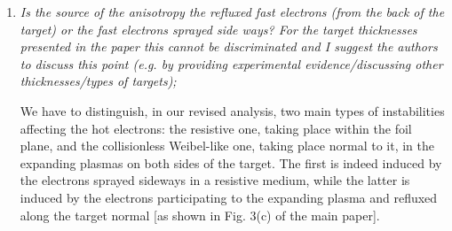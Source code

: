 \documentclass{article}
\begin{document}
\begin{enumerate}
\item \textit{Is the source of the anisotropy the refluxed fast electrons (from the back of the target) or the fast electrons sprayed side ways? For the target thicknesses presented in the paper this cannot be discriminated and I suggest the authors to discuss this point (e.g. by providing experimental evidence/discussing other thicknesses/types of targets); }

We have to distinguish, in our revised analysis, two main types of instabilities affecting the hot electrons: the resistive one, taking place within the foil plane, and the collisionless Weibel-like one, taking place normal to it, in the expanding plasmas on both sides of the target. The first is indeed induced by the electrons sprayed sideways in a resistive medium, while the latter is induced by the electrons participating to the expanding plasma and refluxed along the target normal [as shown in Fig. 3(c) of the main paper].

%
%


\end{enumerate}
\end{document}
